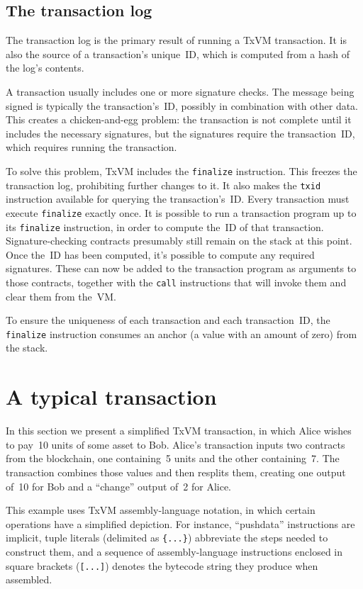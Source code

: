 \documentclass{article}
\newcommand{\txvm}{TxVM}
\begin{document}
\subsection{The transaction log}

The transaction log is the primary result of running a \txvm{}
transaction. It is also the source of a transaction's unique~ID, which
is computed from a hash of the log's contents.

A transaction usually includes one or more signature checks. The
message being signed is typically the transaction's~ID, possibly in
combination with other data. This creates a chicken-and-egg problem:
the transaction is not complete until it includes the necessary
signatures, but the signatures require the transaction~ID, which
requires running the transaction.

To solve this problem, \txvm{} includes the \texttt{finalize}
instruction. This freezes the transaction log, prohibiting further
changes to it. It also makes the \texttt{txid} instruction available
for querying the transaction's~ID. Every transaction must execute
\texttt{finalize} exactly once. It is possible to run a transaction
program up to its \texttt{finalize} instruction, in order to compute
the~ID of that transaction. Signature-checking contracts presumably
still remain on the stack at this point.  Once the~ID has been
computed, it's possible to compute any required signatures.  These can
now be added to the transaction program as arguments to those
contracts, together with the \texttt{call} instructions that will
invoke them and clear them from the~VM.

To ensure the uniqueness of each transaction and each transaction~ID,
the \texttt{finalize} instruction consumes an anchor (a value with an
amount of zero) from the stack.

\section{A typical transaction}

In this section we present a simplified \txvm{} transaction, in which
Alice wishes to pay~10 units of some asset to Bob. Alice's transaction
inputs two contracts from the blockchain, one containing~5 units and
the other containing~7. The transaction combines those values and then
resplits them, creating one output of~10 for Bob and a ``change''
output of~2 for Alice.

This example uses \txvm{} assembly-language notation, in which certain
operations have a simplified depiction. For instance, ``pushdata''
instructions are implicit, tuple literals (delimited as
\texttt{\{...\}}) abbreviate the steps needed to construct them, and a
sequence of assembly-language instructions enclosed in square brackets
(\texttt{[...]}) denotes the bytecode string they produce when
assembled.
\end{document}

